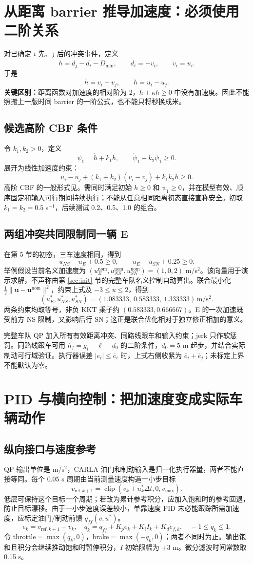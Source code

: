 \documentclass[UTF8,fontset=fandol,11pt,a4paper]{ctexart}
\newcommand{\unit}[1]{\,\mathrm{#1}}\newcommand{\nom}{\mathrm{nom}}
\newcommand{\page}[1]{\clearpage\section{#1}}
\begin{document}
\page{从距离 barrier 推导加速度：必须使用二阶关系}
对已确定 $i$ 先、$j$ 后的冲突事件，定义
\[
h=d_j-d_i-D_{\min},\qquad \dot d_i=-v_i,\qquad \dot v_i=u_i.
\]
于是
\[
\dot h=v_i-v_j,\qquad\ddot h=u_i-u_j.
\]
\textbf{关键区别：}距离函数对加速度的相对阶为 2，$\dot h+\kappa h\geq0$ 中没有加速度。因此不能照搬上一版时间 barrier 的一阶公式，也不能只将秒换成米。

\subsection{候选高阶 CBF 条件}
令 $k_1,k_2>0$，定义
\[
\psi_1=\dot h+k_1h,\qquad\dot\psi_1+k_2\psi_1\geq0.
\]
展开为线性加速度约束：
\begin{equation}\boxed{u_i-u_j+(k_1+k_2)(v_i-v_j)+k_1k_2h\geq0.}\end{equation}
高阶 CBF 的一般形式见\cite{xiao}。需同时满足初始 $h\geq0$ 和 $\psi_1\geq0$，并在模型有效、顺序固定和输入可行期间持续执行；不能从任意相同距离初态直接宣称安全。初取 $k_1=k_2=0.5$ s$^{-1}$，后续测试 0.2、0.5、1.0 的组合。

\subsection{两组冲突共同限制同一辆 E}
在第 5 节的初态，三车速度相同，得到
\[
u_{NS}-u_E+0.5\geq0,\qquad u_E-u_{SN}+0.25\geq0.
\]
举例假设当前名义加速度为 $(u_E^{\nom},u_{NS}^{\nom},u_{SN}^{\nom})=(1,0,2)$ m/s$^2$。该向量用于演示求解，不声称由第 \ref{sec:init} 节的完整车队名义控制自动算出。联合最小化 $\tfrac12\|\mathbf u-\mathbf u^{\nom}\|^2$，约束上式及 $-3\leq u\leq2$，得到
\[
\boxed{(u_E^*,u_{NS}^*,u_{SN}^*)=(1.083333,\ 0.583333,\ 1.333333)\unit{m/s^2}.}
\]
两条约束均取等号，非负 KKT 乘子约 $(0.583333,0.666667)$。E 的一次加速既受前方 NS 限制，又影响后行 SN；这正是联合优化相对于独立修正相加的意义。

完整车队 QP 加入所有有效距离冲突、同路线跟车和输入约束；jerk 只作软惩罚。同路线跟车可用 $h_f=g_i-\ell-d_0$ 的二阶条件，$d_0=5$ m 起步，并结合实际制动可行域验证。执行器误差 $|e_i|\leq\bar e_i$ 时，上式右侧收紧为 $\bar e_i+\bar e_j$；未标定上界不能默认为零。


\page{PID 与横向控制：把加速度变成实际车辆动作}
\subsection{纵向接口与速度参考}
QP 输出单位是 m/s$^2$，CARLA 油门和制动输入是归一化执行器量，两者不能直接等同。每个 0.05 s 周期由当前测量速度构造一小步目标
\[
v_{\mathrm{ref},k+1}=\operatorname{clip}(v_k+u_k^*\Delta t,0,v_{\max}).
\]
低层可保持这个目标一个周期；若改为累计参考积分，应加入饱和时的参考回退，防止目标漂移。由于一小步速度误差较小，单靠速度 PID 未必能跟踪所需加速度，应标定油门/制动前馈 $q_{ff}(v,u^*)$。
\[
e_k=v_{\mathrm{ref},k+1}-v_k,\quad
q_k=q_{ff}+K_pe_k+K_i I_k+K_d\dot e_{f,k},\quad -1\leq q_k\leq1.
\]
令 throttle$=\max(q_k,0)$，brake$=\max(-q_k,0)$；两者不同时为正。输出饱和且积分会继续推动饱和时暂停积分，$I$ 初始限幅为 $\pm3$ m。微分滤波时间常数取 0.15 s。
\end{document}
